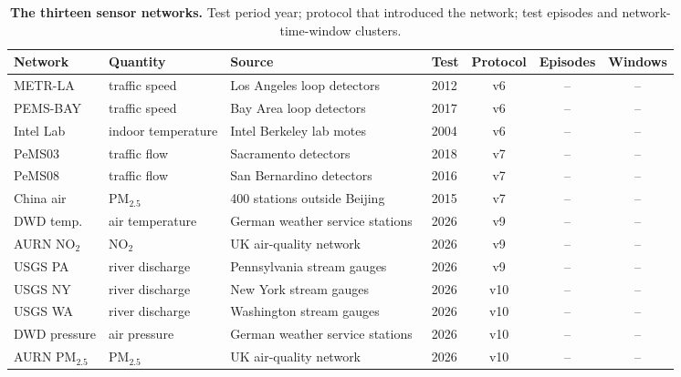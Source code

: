 \begin{table}[h]\centering\scriptsize
\caption{\textbf{The thirteen sensor networks.} Test period year; protocol that introduced the network; test episodes and network-time-window clusters.}
\label{tab:networks}
\begin{tabular}{llllccc}
\toprule
Network & Quantity & Source & Test & Protocol & Episodes & Windows \\
\midrule
METR-LA & traffic speed & Los Angeles loop detectors~\citep{li2018dcrnn} & 2012 & v6 & -- & -- \\
PEMS-BAY & traffic speed & Bay Area loop detectors~\citep{li2018dcrnn} & 2017 & v6 & -- & -- \\
Intel Lab & indoor temperature & Intel Berkeley lab motes~\citep{intellab2004} & 2004 & v6 & -- & -- \\
PeMS03 & traffic flow & Sacramento detectors~\citep{song2020stsgcn} & 2018 & v7 & -- & -- \\
PeMS08 & traffic flow & San Bernardino detectors~\citep{guo2019astgcn} & 2016 & v7 & -- & -- \\
China air & PM$_{2.5}$ & 400 stations outside Beijing~\citep{zheng2015forecasting} & 2015 & v7 & -- & -- \\
DWD temp. & air temperature & German weather service stations~\citep{dwd2026} & 2026 & v9 & -- & -- \\
AURN NO$_2$ & NO$_2$ & UK air-quality network~\citep{carslaw2012openair} & 2026 & v9 & -- & -- \\
USGS PA & river discharge & Pennsylvania stream gauges~\citep{usgs2026nwis} & 2026 & v9 & -- & -- \\
USGS NY & river discharge & New York stream gauges~\citep{usgs2026nwis} & 2026 & v10 & -- & -- \\
USGS WA & river discharge & Washington stream gauges~\citep{usgs2026nwis} & 2026 & v10 & -- & -- \\
DWD pressure & air pressure & German weather service stations~\citep{dwd2026} & 2026 & v10 & -- & -- \\
AURN PM$_{2.5}$ & PM$_{2.5}$ & UK air-quality network~\citep{carslaw2012openair} & 2026 & v10 & -- & -- \\
\bottomrule
\end{tabular}
\end{table}